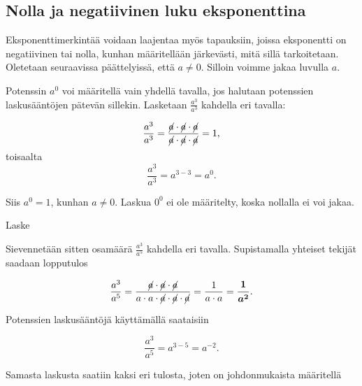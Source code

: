 \subsection{Nolla ja negatiivinen luku eksponenttina}

Eksponenttimerkintää voidaan laajentaa myös tapauksiin, joissa eksponentti on negatiivinen tai nolla, kunhan määritellään järkevästi, mitä sillä tarkoitetaan. Oletetaan seuraavissa päättelyissä, että $a \neq 0$. Silloin voimme jakaa luvulla $a$.

Potenssin $a^0$ voi määritellä vain yhdellä tavalla, jos halutaan potenssien laskusääntöjen pätevän sillekin. Lasketaan $\frac{a^3}{a^3}$ kahdella eri tavalla:

    \[
        \frac{a^3}{a^3}=\frac{\cancel{a}\cdot \cancel{a}\cdot \cancel{a}}
        {\cancel{a}\cdot \cancel{a}\cdot \cancel{a}}=1,
    \]
	toisaalta
 \[ \frac{a^3}{a^3}=a^{3-3}=a^0. \]

Siis $a^0=1$, kunhan $a\neq 0$.  Laskua $0^0$ ei ole määritelty, koska nollalla ei voi jakaa. 
 
  
    
    \begin{esimerkki}
        Laske
    \end{esimerkki}    
    
Sievennetään sitten osamäärä $\frac{a^3}{a^5}$ kahdella eri tavalla. Supistamalla yhteiset tekijät saadaan lopputulos
    
    \begin{equation*}
        \frac{a^3}{a^5} =
        \frac{\cancel{a}\cdot \cancel{a}\cdot \cancel{a}}{a\cdot a\cdot
        \cancel{a}\cdot \cancel{a}\cdot \cancel{a}} = 
        \frac{1}{a\cdot a}=\boldsymbol{\frac{1}{a^2}}.
    \end{equation*}
    
Potenssien laskusääntöjä käyttämällä saataisiin
    
    \begin{equation*}
        \frac{a^3}{a^5} = a^{3-5}= a^{-2}{.}
    \end{equation*}
    
Samasta laskusta saatiin kaksi eri tulosta, joten on johdonmukaista määritellä
    

